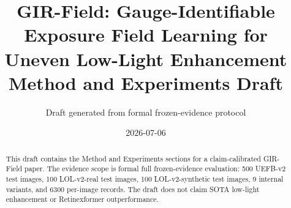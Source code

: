 \documentclass[10pt]{article}
\title{GIR-Field: Gauge-Identifiable Exposure Field Learning for Uneven Low-Light Enhancement\\Method and Experiments Draft}
\author{Draft generated from formal frozen-evidence protocol}
\date{2026-07-06}
\begin{document}
\maketitle

\begin{abstract}
This draft contains the Method and Experiments sections for a claim-calibrated GIR-Field paper. The evidence scope is formal full frozen-evidence evaluation: 500 UEFB-v2 test images, 100 LOL-v2-real test images, 100 LOL-v2-synthetic test images, 9 internal variants, and 6300 per-image records. The draft does not claim SOTA low-light enhancement or Retinexformer outperformance.
\end{abstract}






\end{document}
